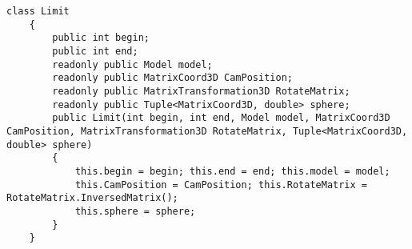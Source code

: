 \newpage
\begin{center}
	\begin{lstlisting}[label=struct,caption = { Структура для передачи в поток}]
	  class Limit
	{
		public int begin;
		public int end;
		readonly public Model model;
		readonly public MatrixCoord3D CamPosition;
		readonly public MatrixTransformation3D RotateMatrix;
		readonly public Tuple<MatrixCoord3D, double> sphere;
		public Limit(int begin, int end, Model model, MatrixCoord3D CamPosition, MatrixTransformation3D RotateMatrix, Tuple<MatrixCoord3D, double> sphere)
		{
			this.begin = begin; this.end = end; this.model = model; 
			this.CamPosition = CamPosition; this.RotateMatrix = RotateMatrix.InversedMatrix();
			this.sphere = sphere;
		}
	}
		
	\end{lstlisting}
\end{center}
\newpage


